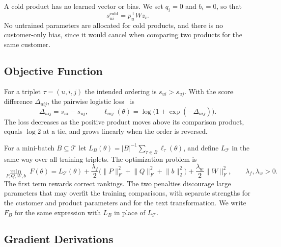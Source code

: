 \documentclass[12pt,a4paper]{article}
\newcommand{\norm}[1]{\lVert #1 \rVert}
\begin{document}
A cold product has no learned vector or bias. We set $q_i = 0$ and $b_i = 0$,
so that
\begin{equation}
    s_{ui}^{\mathrm{cold}} = p_u^\top W z_i .
    \label{eq:cold}
\end{equation}
No untrained parameters are allocated for cold products, and there is no
customer-only bias, since it would cancel when comparing two products for the
same customer.

\subsection{Objective Function}

For a triplet $\tau = (u, i, j)$ the intended ordering is $s_{ui} > s_{uj}$.
With the score difference $\Delta_{uij}$, the pairwise logistic
loss~\cite{bpr} is
\begin{equation}
    \Delta_{uij} = s_{ui} - s_{uj}, \qquad
    \ell_{uij}(\theta) = \log\bigl(1 + \exp(-\Delta_{uij})\bigr).
    \label{eq:loss}
\end{equation}
The loss decreases as the positive product moves above its comparison product,
equals $\log 2$ at a tie, and grows linearly when the order is reversed.

For a mini-batch $B \subseteq \mathcal{T}$ let
$L_B(\theta) = |B|^{-1} \sum_{\tau \in B} \ell_\tau(\theta)$, and define
$L_{\mathcal{T}}$ in the same way over all training triplets. The optimization
problem is
\begin{equation}
    \min_{P, Q, W, b} \; F(\theta) = L_{\mathcal{T}}(\theta)
    + \frac{\lambda_f}{2}\bigl(\norm{P}_F^2 + \norm{Q}_F^2 + \norm{b}_2^2\bigr)
    + \frac{\lambda_w}{2}\norm{W}_F^2,
    \qquad \lambda_f, \lambda_w > 0 .
    \label{eq:objective}
\end{equation}
The first term rewards correct rankings. The two penalties discourage large
parameters that may overfit the training comparisons, with separate strengths
for the customer and product parameters and for the text transformation. We
write $F_B$ for the same expression with $L_B$ in place of $L_{\mathcal{T}}$.

\subsection{Gradient Derivations}
\end{document}
